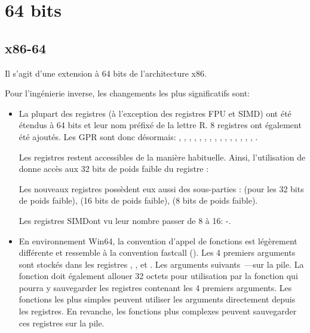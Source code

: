 \section{64 bits}

\subsection{x86-64}
\label{x86-64}

Il s'agit d'une extension à 64 bits de l'architecture x86.

Pour l'ingénierie inverse, les changements les plus significatifs sont:

\myindex{\CLanguageElements!\Pointers}
\begin{itemize}

\item

La plupart des registres (à l'exception des registres FPU et SIMD) ont été étendus à 64 bits et 
leur nom préfixé de la lettre R. 8 registres ont également été ajoutés.
Les \ac{GPR} sont donc désormais: \RAX, \RBX, \RCX, \RDX, 
\RBP, \RSP, \RSI, \RDI, , , , 
, , , , . 

Les  registres restent accessibles de la manière habituelle. Ainsi, l'utilisation de 
\EAX donne accès aux 32 bits de poids faible du registre \RAX:


Les nouveaux registres  possèdent eux aussi des sous-parties :  
(pour les 32 bits de poids faible),  (16 bits de poids faible),  
(8 bits de poids faible).


Les registres SIMDont vu leur nombre passer de 8 à 16: -.

\item

En environnement Win64, la convention d'appel de fonctions est légèrement différente et ressemble 
à la convention fastcall ().
Les 4 premiers arguments sont stockés dans les registres \RCX, \RDX,  et . Les 
arguments suivants~---sur la pile.
La fonction  doit également allouer 32 octets pour utilisation par la fonction
 qui pourra y sauvegarder les registres contenant les 4 premiers arguments.
Les fonctions les plus simples peuvent utiliser les arguments directement depuis les registres. 
En revanche, les fonctions plus complexes peuvent sauvegarder ces registres sur la pile.


\end{itemize}
